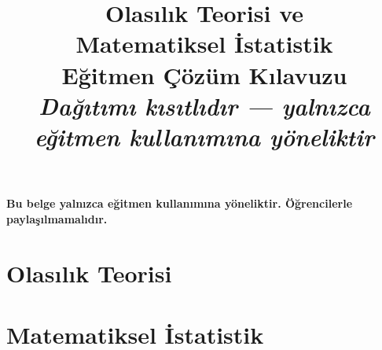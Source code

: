 \documentclass[12pt, a4paper, twoside]{book}
\title{%
  {\Huge\bfseries Olasılık Teorisi ve}\\[4pt]
  {\Huge\bfseries Matematiksel İstatistik}\\[12pt]
  {\LARGE\color{red!70!black}\bfseries Eğitmen Çözüm Kılavuzu}\\[6pt]
  {\large\itshape Dağıtımı kısıtlıdır — yalnızca eğitmen kullanımına yöneliktir}%
}
\author{}
\date{}
\begin{document}
\frontmatter
\maketitle

{\color{red!70!black}\bfseries\large
Bu belge yalnızca eğitmen kullanımına yöneliktir.
Öğrencilerle paylaşılmamalıdır.
}
\vspace{1cm}

\tableofcontents

\mainmatter

\part{Olasılık Teorisi}













\part{Matematiksel İstatistik}










\appendix








\backmatter
\end{document}
